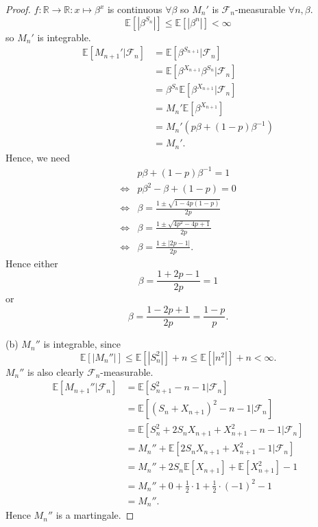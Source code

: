 \documentclass{article}
\begin{document}
\begin{proof}
\noindent$f:\mathbb{R}\to\mathbb{R}:x\mapsto\beta^x$ is continuous $\forall \beta$ so $M_n'$ is $\mathcal{F}_n$-measurable $\forall n,\beta$.\[\mathbb{E}[|\beta^{S_n}|]\leq\mathbb{E}[|\beta^n|]<\infty\] so $M_n'$ is integrable.\begin{align*}
\mathbb{E}[M_{n+1}'|\mathcal{F}_n]&=\mathbb{E}[\beta^{S_{n+1}}|\mathcal{F}_n]\\&=\mathbb{E}[\beta^{X_{n+1}}\beta^{S_n}|\mathcal{F}_n]\\&=\beta^{S_n}\mathbb{E}[\beta^{X_{n+1}}|\mathcal{F}_n]\\&=M_n'\mathbb{E}[\beta^{X_{n+1}}]\\&=M_n'(p\beta+(1-p)\beta^{-1})\\&=M_n'.
\end{align*}
Hence, we need\begin{align*}
&p\beta+(1-p)\beta^{-1}=1\\\iff &p\beta^2-\beta+(1-p)=0\\\iff&\beta=\frac{1\pm\sqrt{1-4p(1-p)}}{2p}\\\iff&\beta=\frac{1\pm\sqrt{4p^2-4p+1}}{2p}\\\iff&\beta=\frac{1\pm|2p-1|}{2p}.
\end{align*} Hence either \[\beta=\frac{1+2p-1}{2p}=1\] or \[\beta=\frac{1-2p+1}{2p}=\frac{1-p}{p}.\]
\item[(b)] $M_n''$ is integrable, since\[\mathbb{E}[|M_n''|]\leq\mathbb{E}[|S_n^2|]+n\leq\mathbb{E}[|n^2|]+n<\infty.\] $M_n''$ is also clearly $\mathcal{F}_n$-measurable. \begin{align*}
\mathbb{E}[M_{n+1}''|\mathcal{F}_n]&=\mathbb{E}[S_{n+1}^2-n-1|\mathcal{F}_n]\\&=\mathbb{E}[(S_n+X_{n+1})^2-n-1|\mathcal{F}_n]\\&=\mathbb{E}[S_n^2+2S_nX_{n+1}+X_{n+1}^2-n-1|\mathcal{F}_n]\\&=M_n''+\mathbb{E}[2S_nX_{n+1}+X_{n+1}^2-1|\mathcal{F}_n]\\&=M_n''+2S_n\mathbb{E}[X_{n+1}]+\mathbb{E}[X_{n+1}^2]-1\\&=M_n''+0+\frac{1}{2}\cdot 1+\frac{1}{2}\cdot(-1)^2-1\\&=M_n''.
\end{align*}
Hence $M_n''$ is a martingale.
\end{proof}
\end{document}
